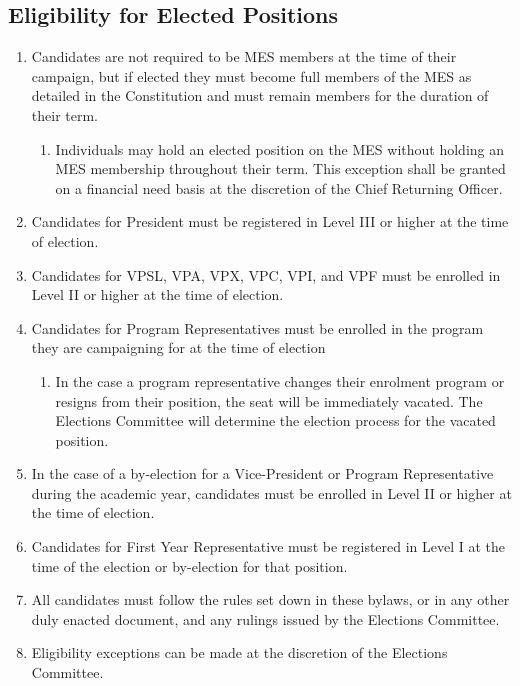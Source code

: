 \subsection{Eligibility for Elected Positions}
\label{eligibility-for-elected-positions}

\begin{enumerate}
 \item
  Candidates are not required to be MES members at the time of their campaign, but if elected they must become full members of the MES as detailed in the Constitution and must remain members for the duration of their term.

  \begin{enumerate}
   \item
    Individuals may hold an elected position on the MES without holding an MES membership throughout their term. This exception shall be granted on a financial need basis at the discretion of the Chief Returning Officer.
  \end{enumerate}
 \item
  Candidates for President must be registered in Level III or higher at the time of election.
 \item
  Candidates for VPSL, VPA, VPX, VPC, VPI, and VPF must be enrolled in Level II or higher at the time of election.
 \item
  Candidates for Program Representatives must be enrolled in the program they are campaigning for at the time of election

  \begin{enumerate}
   \item
    In the case a program representative changes their enrolment program or resigns from their position, the seat will be immediately vacated. The Elections Committee will determine the election process for the vacated position.
  \end{enumerate}
 \item
  In the case of a by-election for a Vice-President or Program Representative during the academic year, candidates must be enrolled in Level II or higher at the time of election.
 \item
  Candidates for First Year Representative must be registered in Level I at the time of the election or by-election for that position.
 \item
  All candidates must follow the rules set down in these bylaws, or in any other duly enacted document, and any rulings issued by the Elections Committee.
 \item
  Eligibility exceptions can be made at the discretion of the Elections Committee.
\end{enumerate}

